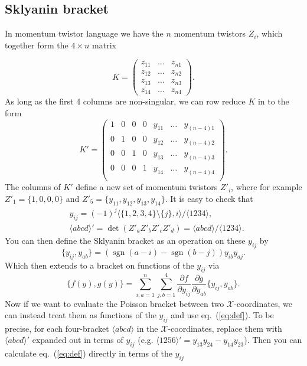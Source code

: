 \documentclass[11pt]{article}
\DeclareMathOperator{\sgn}{sgn}
\def\ket#1{\langle #1 \rangle}
\begin{document}
\subsection{Sklyanin bracket}
In momentum twistor language we have the $n$ momentum twistors $Z_i$, which together form the $4 \times n$ matrix

\begin{equation}  
K = \left(\begin{array}{ccc}
z_{11} & \ldots & z_{n1} \\
z_{12} & \ldots & z_{n2} \\
z_{13} & \ldots & z_{n3} \\
z_{14} & \ldots & z_{n4}\end{array}\right).
\end{equation}
As long as the first 4 columns are non-singular, we can row reduce $K$ in to the form
\begin{equation}
K'=\left(
\begin{array}{ccccccc}
 1 & 0 & 0 & 0 & y_{11} & \ldots  & y_{(n-4)1} \\
 0 & 1 & 0 & 0 & y_{12} & \ldots  & y_{(n-4)2} \\
 0 & 0 & 1 & 0 & y_{13} & \ldots  & y_{(n-4)3} \\
 0 & 0 & 0 & 1 & y_{14} & \ldots  & y_{(n-4)4} \\
\end{array}
\right).
\end{equation}
The columns of $K'$ define a new set of momentum twistors $Z'_i$, where for example $Z'_1 = \{1,0,0,0\}$ and $Z'_5 = \{y_{11},y_{12},y_{13},y_{14}\}$. It is easy to check that 
\begin{align}
   &y_{ij} = (-1)^j \ket{\{1,2,3,4\}\setminus\{j\},i}/\ket{1234},\\
   &\ket{abcd}' = \det(Z'_a Z'_b Z'_c Z'_d) = \ket{abcd}/\ket{1234}.
\end{align}
You can then define the Sklyanin bracket as an operation on these $y_{ij}$ by
\begin{equation}
   \{y_{ij},y_{ab}\} = (\sgn(a-i) - \sgn(b-j)) y_{ib} y_{aj}.
\end{equation}
Which then extends to a bracket on functions of the $y_{ij}$ via
\begin{equation}\label{eq:def}
   \{f(y), g(y)\} =  \sum_{i,a=1}^n\sum_{j,b=1}^4\frac{\partial f}{\partial y_{ij}}  \frac{\partial g}{\partial y_{ab}} 
\{y_{ij}, y_{ab}\}.
\end{equation}
Now if we want to evaluate the Poisson bracket between two $\mathcal{X}$-coordinates, we can instead treat them as functions of the $y_{ij}$ and use eq.~(\ref{eq:def}). To be precise, for each four-bracket $\ket{abcd}$ in the $\mathcal{X}$-coordinates, replace them with $\ket{abcd}'$ expanded out in terms of $y_{ij}$ (e.g. $\ket{1256}' =y_{13} y_{24}-y_{14} y_{23}$). Then you can calculate eq.~(\ref{eq:def}) directly in terms of the $y_{ij}$
\end{document}
